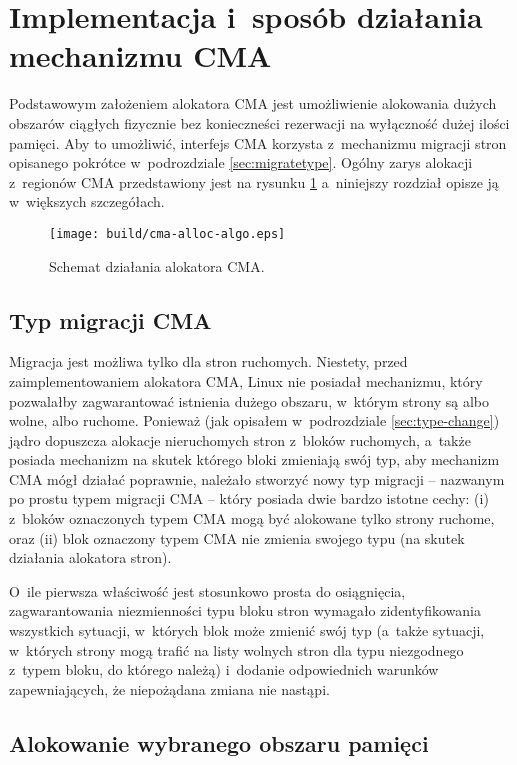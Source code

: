 \section{Implementacja i~sposób działania mechanizmu CMA}

Podstawowym założeniem alokatora CMA jest umożliwienie alokowania
dużych obszarów ciągłych fizycznie bez konieczneści rezerwacji na
wyłączność dużej ilości pamięci.  Aby to umożliwić, interfejs CMA
korzysta z~mechanizmu migracji stron opisanego pokrótce w~podrozdziale
\ref{sec:migratetype}.  Ogólny zarys alokacji z~regionów CMA
przedstawiony jest na rysunku \ref{fig:cma-alloc-algo} a~niniejszy
rozdział opisze ją w~większych szczegółach.

\begin{figure}[tbp]
  \texttt{[image: build/cma-alloc-algo.eps]}
  \caption{Schemat działania alokatora CMA.}
  \label{fig:cma-alloc-algo}
\end{figure}


\subsection{Typ migracji CMA}\label{sec:migrate-cma}

Migracja jest możliwa tylko dla stron ruchomych.  Niestety, przed
zaimplementowaniem alokatora CMA, Linux nie posiadał mechanizmu, który
pozwalałby zagwarantować istnienia dużego obszaru, w~którym strony są
albo wolne, albo ruchome.  Ponieważ (jak opisałem w~podrozdziale
\ref{sec:type-change}) jądro dopuszcza alokacje nieruchomych stron
z~bloków ruchomych, a~także posiada mechanizm na skutek którego bloki
zmieniają swój typ, aby mechanizm CMA mógł działać poprawnie, należało
stworzyć nowy typ migracji -- nazwanym po prostu typem migracji CMA --
który posiada dwie bardzo istotne cechy: (i) z~bloków oznaczonych
typem CMA mogą być alokowane tylko strony ruchome, oraz (ii) blok
oznaczony typem CMA nie zmienia swojego typu (na skutek działania
alokatora stron).

O~ile pierwsza właściwość jest stosunkowo prosta do osiągnięcia,
zagwarantowania niezmienności typu bloku stron wymagało
zidentyfikowania wszystkich sytuacji, w~których blok może zmienić swój
typ (a~także sytuacji, w~których strony mogą trafić na listy wolnych
stron dla typu niezgodnego z~typem bloku, do którego należą) i~dodanie
odpowiednich warunków zapewniających, że niepożądana zmiana nie
nastąpi.

\subsection{Alokowanie wybranego obszaru pamięci}\label{sec:alloc-contig-range}

